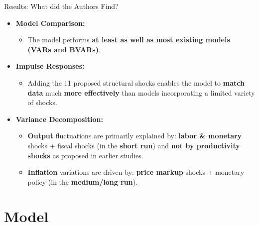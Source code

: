 \documentclass{beamer}
\begin{document}
\begin{frame}{Results: What did the Authors Find?}   
    \begin{itemize}    
        \item \textbf{Model Comparison:}    
        \begin{itemize}    
            \item The model performs \textbf{at least as well as most existing models (VARs and BVARs)}.  
        \end{itemize}    
            
        \vspace{0.5em}    
            
        \item \textbf{Impulse Responses:}    
        \begin{itemize}    
            \item Adding the 11 proposed structural shocks enables the model to \textbf{match data} much \textbf{more effectively} than models incorporating a limited variety of shocks.  
        \end{itemize}    
            
        \vspace{0.5em}    
            
        \item \textbf{Variance Decomposition:}    
        \begin{itemize}    
            \item \textbf{Output} fluctuations are primarily explained by: \textbf{labor \& monetary} shocks + fiscal shocks (in the \textbf{short run}) and \textbf{not by productivity shocks} as proposed in earlier studies.  
            \item \textbf{Inflation} variations are driven by: \textbf{price markup} shocks + monetary policy (in the \textbf{medium/long run}).  
        \end{itemize}    
    \end{itemize}    
\end{frame}  

\section{Model}
\end{document}
